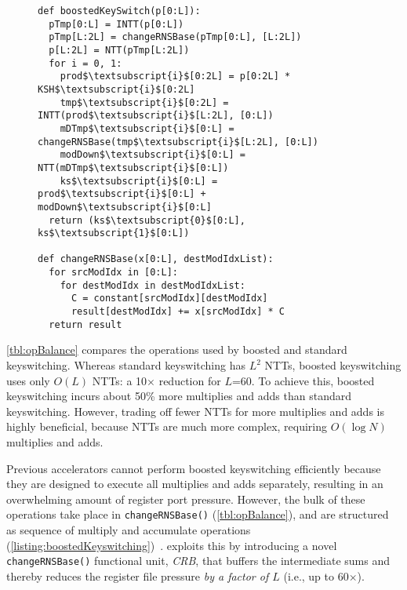     \begin{figure}\label{lst:boostedKeyswitching}
      \begin{center}
          \begin{lstlisting}[caption={Boosted keyswitching implementation.}, mathescape=true, style=custompython, label=listing:boostedKeyswitching]
def boostedKeySwitch(p[0:L]):
  pTmp[0:L] = INTT(p[0:L])
  pTmp[L:2L] = changeRNSBase(pTmp[0:L], [L:2L])
  p[L:2L] = NTT(pTmp[L:2L])
  for i = 0, 1:
    prod$\textsubscript{i}$[0:2L] = p[0:2L] * KSH$\textsubscript{i}$[0:2L]
    tmp$\textsubscript{i}$[0:2L] = INTT(prod$\textsubscript{i}$[L:2L], [0:L])
    mDTmp$\textsubscript{i}$[0:L] = changeRNSBase(tmp$\textsubscript{i}$[L:2L], [0:L])
    modDown$\textsubscript{i}$[0:L] = NTT(mDTmp$\textsubscript{i}$[0:L])
    ks$\textsubscript{i}$[0:L] = prod$\textsubscript{i}$[0:L] + modDown$\textsubscript{i}$[0:L]
  return (ks$\textsubscript{0}$[0:L], ks$\textsubscript{1}$[0:L])

def changeRNSBase(x[0:L], destModIdxList):
  for srcModIdx in [0:L]:
    for destModIdx in destModIdxList:
      C = constant[srcModIdx][destModIdx]
      result[destModIdx] += x[srcModIdx] * C 
  return result
          \end{lstlisting}
        \end{center}
      \end{figure}

\tblOpBalance

\autoref{tbl:opBalance} compares the operations used by boosted and standard keyswitching.
Whereas standard keyswitching has $L^2$ NTTs, boosted keyswitching uses only $O(L)$ NTTs:
a 10$\times$ reduction for $L$=60. To achieve this, boosted keyswitching incurs about 50\%
more multiplies and adds than standard keyswitching.
However, trading off fewer NTTs for more multiplies and adds is highly beneficial,
because NTTs are much more complex, requiring $O(\log N)$ multiplies and adds.

Previous accelerators cannot perform boosted keyswitching efficiently because
they are designed to execute all multiplies and adds separately, resulting in an
overwhelming amount of register port pressure.
However, the bulk of these \mbox{operations} take place in \verb!changeRNSBase()!
(\autoref{tbl:opBalance}), and are structured as sequence of multiply and accumulate
operations (\autoref{listing:boostedKeyswitching})~\cite{bajard:2016:full}.
\name exploits this by introducing a novel \verb!changeRNSBase()! functional
unit, \emph{CRB}, that buffers the intermediate sums and thereby reduces the
register file pressure \emph{by a factor of $L$} (i.e., up to 60$\times$).

